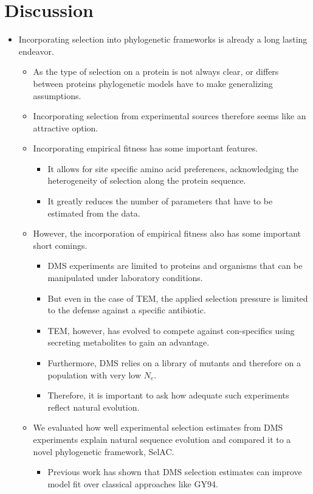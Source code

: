 \documentclass[12pt]{article}
\begin{document}
\section*{Discussion}
\begin{itemize}
	\item Incorporating selection into phylogenetic frameworks is already a long lasting endeavor.
	\begin{itemize}
		\item As the type of selection on a protein is not always clear, or differs between proteins phylogenetic models have to make generalizing assumptions.
		\item Incorporating selection from experimental sources therefore seems like an attractive option.
		\item Incorporating empirical fitness has some important features.
		\begin{itemize}
			\item It allows for site specific amino acid preferences, acknowledging the heterogeneity of selection along the protein sequence.
			\item It greatly reduces the number of parameters that have to be estimated from the data.
		\end{itemize}
		\item However, the incorporation of empirical fitness also has some important short comings.
		\begin{itemize}
			\item DMS experiments are limited to proteins and organisms that can be manipulated under laboratory conditions.
			\item But even in the case of TEM, the applied selection pressure is limited to the defense against a specific antibiotic.
			\item TEM, however, has evolved to compete against con-specifics using secreting metabolites to gain an advantage.
			\item Furthermore, DMS relies on a library of mutants and therefore on a population with very low $N_e$.
			\item Therefore, it is important to ask how adequate such experiments reflect natural evolution. 
		\end{itemize}
		\item We evaluated how well experimental selection estimates from DMS experiments explain natural sequence evolution and compared it to a novel phylogenetic framework, SelAC.
		\begin{itemize}
			\item Previous work has shown that DMS selection estimates can improve model fit over classical approaches like GY94.

\end{itemize}
\end{itemize}
\end{itemize}
\end{document}
